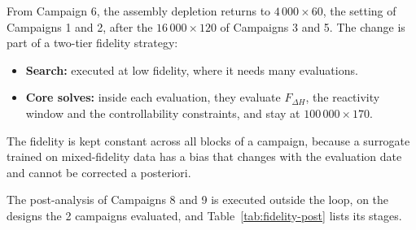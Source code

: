 From Campaign 6, the assembly depletion returns to $4\,000\times60$,
the setting of Campaigns 1 and 2, after the $16\,000\times120$ of
Campaigns 3 and 5. The change is part of a two-tier fidelity strategy:

\begin{itemize}
  \item \textbf{Search:} executed at low fidelity, where it needs many
        evaluations.
  \item \textbf{Core solves:} inside each evaluation, they evaluate
        $F_{\Delta H}$, the reactivity window and the controllability
        constraints, and stay at $100\,000\times170$.
\end{itemize}

The fidelity is kept constant across all blocks of a campaign, because
a surrogate trained on mixed-fidelity data has a bias that changes with
the evaluation date and cannot be corrected a posteriori.

The post-analysis of Campaigns 8 and 9 is executed outside the loop, on
the designs the 2 campaigns evaluated, and Table~\ref{tab:fidelity-post}
lists its stages.

